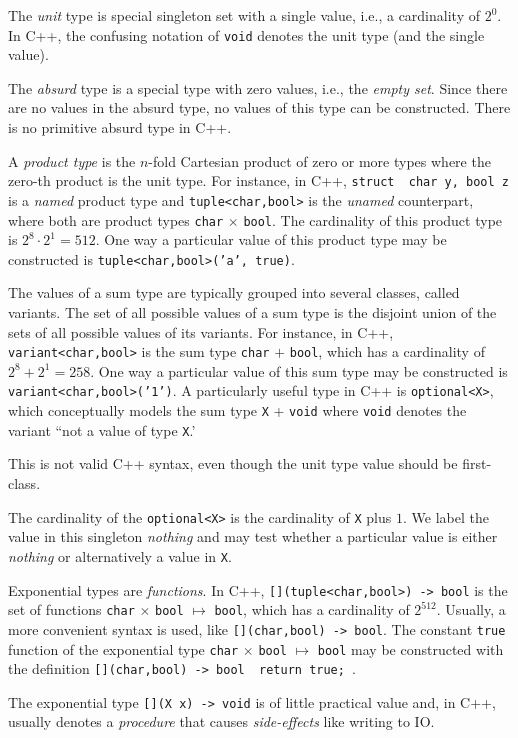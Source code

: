 \documentclass[ ../main.tex]{subfiles}
\begin{document}
The \emph{unit} type is special singleton set with a single value, i.e., a cardinality of $2^0$.
In C++, the confusing notation of \texttt{void} denotes the unit type (and the single value).
\begin{remark}
	The \emph{absurd} type is a special type with zero values, i.e., the \emph{empty set}.
	Since there are no values in the absurd type, no values of this type can be constructed.
	There is no primitive absurd type in C++.
\end{remark}

A \emph{product type} is the $n$-fold Cartesian product of zero or more types where the zero-th product is the unit type.
For instance, in C++, \texttt{struct { char y, bool z }} is a \emph{named} product type and \texttt{tuple<char,bool>}
is the \emph{unamed} counterpart, where both are product types \texttt{char} $\times$ \texttt{bool}.
The cardinality of this product type is $2^8 \cdot 2^1 = 512$.
One way a particular value of this product type may be constructed is \texttt{tuple<char,bool>('a', true)}.

The values of a sum type are typically grouped into several classes, called variants.
The set of all possible values of a sum type is the disjoint union of the sets of all possible values of its variants.
For instance, in C++, \texttt{variant<char,bool>}
is the sum type \texttt{char} $+$ \texttt{bool}, which has a cardinality of $2^8 + 2^1 = 258$.
One way a particular value of this sum type may be constructed is \texttt{variant<char,bool>('1')}.
A particularly useful type in C++ is \texttt{optional<X>}, which conceptually models the sum type \texttt{X} + \texttt{void} where \texttt{void} denotes the variant ``not a value of type \texttt{X}.'
\begin{remark}
	This is not valid C++ syntax, even though the unit type value should be first-class.
\end{remark}
The cardinality of the \texttt{optional<X>} is the cardinality of \texttt{X} plus $1$.
We label the value in this singleton \emph{nothing} and may test whether a particular value is either \emph{nothing} or alternatively a value in \texttt{X}.

Exponential types are \emph{functions}.
In C++, \texttt{[](tuple<char,bool>) -> bool} is the set of functions \texttt{char} $\times$ \texttt{bool} $\mapsto$ \texttt{bool}, which has a cardinality of $2^{512}$.
Usually, a more convenient syntax is used, like \texttt{[](char,bool) -> bool}.
The constant \texttt{true} function of the exponential type \texttt{char} $\times$ \texttt{bool} $\mapsto$ \texttt{bool} may be constructed with the definition \texttt{[](char,bool) -> bool { return true; }}.
\begin{remark}
	The exponential type \texttt{[](X x) -> void} is of little practical value and, in C++, usually denotes a \emph{procedure} that causes \emph{side-effects} like writing to IO.
\end{remark}
\end{document}
